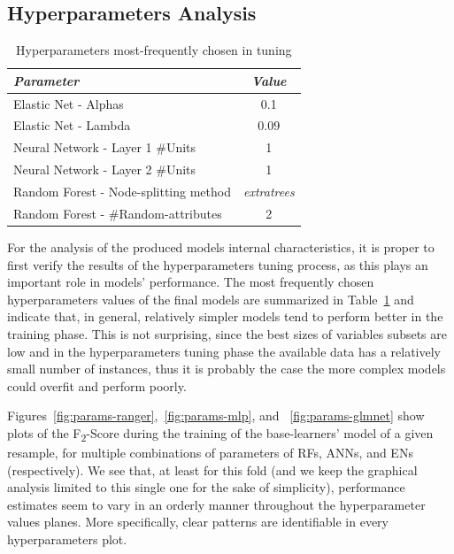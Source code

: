 \subsection{Hyperparameters Analysis}\label{subsec:hyperparameters-analysis}

\begin{table}[h]
    \caption{Hyperparameters most-frequently chosen in tuning}
    \begin{center}
        \begin{tabular}{l|c}
            \textit{Parameter}                    & \textit{Value}      \\
            \hline
            \hline
            Elastic Net - Alphas                  & 0.1                 \\
            Elastic Net - Lambda                  & 0.09                \\
            Neural Network - Layer 1 \#Units      & 1                   \\
            Neural Network - Layer 2 \#Units      & 1                   \\
            Random Forest - Node-splitting method & \textit{extratrees} \\
            Random Forest - \#Random-attributes   & 2                   \\
            \hline
        \end{tabular}
    \end{center}
    \label{tab:most-frequent-hyperparams}
\end{table}

For the analysis of the produced models internal characteristics, it is proper to first verify the results of the hyperparameters tuning process, as this plays an important role in models' performance.
The most frequently chosen hyperparameters values of the final models are summarized in Table~\ref{tab:most-frequent-hyperparams} and indicate that, in general, relatively simpler models tend to perform better in the training phase.
This is not surprising, since the best sizes of variables subsets are low and in the hyperparameters tuning phase the available data has a relatively small number of instances, thus it is probably the case the more complex models could overfit and perform poorly.

Figures~\ref{fig:params-ranger},~\ref{fig:params-mlp}, and ~\ref{fig:params-glmnet} show plots of the F\textsubscript{2}-Score during the training of the base-learners' model of a given resample, for multiple combinations of parameters of RFs, ANNs, and ENs (respectively).
We see that, at least for this fold (and we keep the graphical analysis limited to this single one for the sake of simplicity), performance estimates seem to vary in an orderly manner throughout the hyperparameter values planes.
More specifically, clear patterns are identifiable in every hyperparameters plot.

